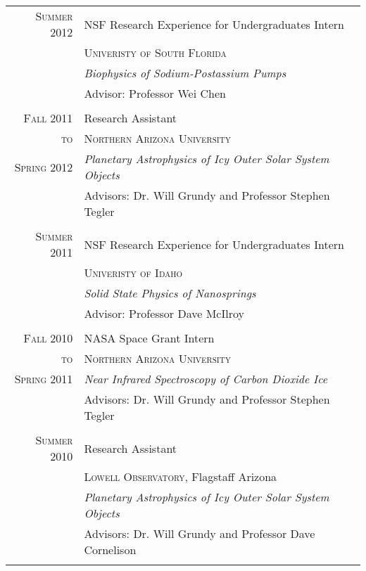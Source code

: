 \documentclass[letterpaper,10pt]{article} %
\begin{document}
\begin{tabular}{r|p{11cm}}

\textsc{Summer 2012} & NSF Research Experience for Undergraduates Intern \\
& \textsc{Univeristy of South Florida} \\
&\emph{Biophysics of Sodium-Postassium Pumps}\\ 
& Advisor: Professor Wei Chen \\
\multicolumn{2}{c}{} \\


\textsc{Fall 2011} & Research Assistant \\
\textsc{to} & \textsc{Northern Arizona University} \\
\textsc{Spring 2012} &\emph{Planetary Astrophysics of Icy Outer Solar System Objects}\\ 
& Advisors: Dr. Will Grundy and Professor Stephen Tegler \\
\multicolumn{2}{c}{} \\


\textsc{Summer 2011} & NSF Research Experience for Undergraduates Intern \\
& \textsc{Univeristy of Idaho} \\
&\emph{Solid State Physics of Nanosprings}\\ 
& Advisor: Professor Dave McIlroy \\

\multicolumn{2}{c}{} \\


\textsc{Fall 2010} & NASA Space Grant Intern\\
\textsc{to} & \textsc{Northern Arizona University} \\
\textsc{Spring 2011} &\emph{Near Infrared Spectroscopy of Carbon Dioxide Ice}\\ 
& Advisors: Dr. Will Grundy and Professor Stephen Tegler \\

\multicolumn{2}{c}{} \\


\textsc{Summer 2010} & Research Assistant \\
& \textsc{Lowell Observatory}, Flagstaff Arizona \\
&\emph{Planetary Astrophysics of Icy Outer Solar System Objects}\\ 
& Advisors: Dr. Will Grundy and Professor Dave Cornelison \\

\multicolumn{2}{c}{} \\


\end{tabular}
\end{document}
